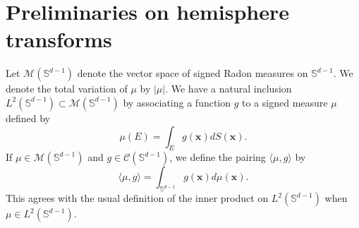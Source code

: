 \documentclass{article}
\theoremstyle{definition}
\newcommand{\mc}{\mathcal}
\renewcommand{\S}{\mathbb{S}}
\def\vx{{\bm{x}}}
\begin{document}
\section{Preliminaries on hemisphere transforms}\label{app:hemisphere}
Let $\mathcal{M}(\S^{d - 1})$ denote the vector space of signed Radon measures on $\S^{d - 1}$. We denote the total variation of $\mu$ by $|\mu|$. We have a natural inclusion $L^2(\S^{d - 1}) \subset \mathcal{M}(\S^{d -1})$ by associating a function $g$ to a signed measure $\mu$ defined by
\[\mu(E) = \int_E g(\vx) dS(\vx). \]
If $\mu \in \mc{M}(\S^{d -1 })$ and $g \in \mc{C}(\S^{d - 1})$, we define the pairing $\langle \mu, g \rangle$ by
\[\langle \mu, g \rangle = \int_{\S^{d-1}} {g(\vx)}d\mu(\vx). \]
This agrees with the usual definition of the inner product on $L^2(\S^{d-1})$ when $\mu \in L^2(\S^{d-1})$.
\end{document}
